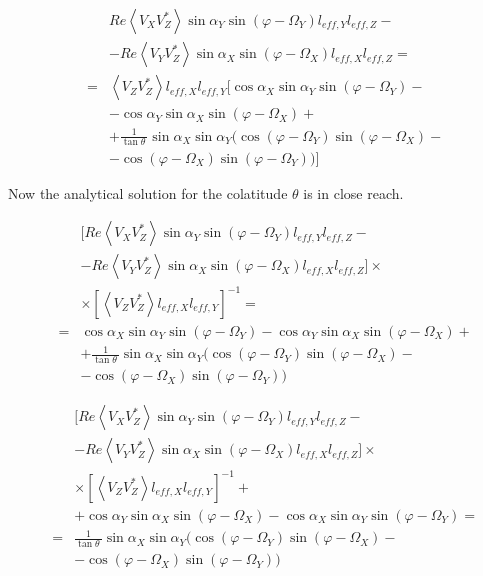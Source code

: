 \documentclass[a4paper,11pt]{report}
\begin{document}
\begin{eqnarray}
&&Re \left\langle V_X V_Z^{*}\right\rangle \sin \alpha_Y  \sin (\varphi - \Omega_Y) l_{eff,Y}l_{eff,Z}-\nonumber \\
&&-Re \left\langle V_Y V_Z^{*}\right\rangle\sin \alpha_X  \sin (\varphi - \Omega_X) l_{eff,X}l_{eff,Z}= \nonumber \\
&=&\left\langle V_Z V_Z^{*} \right\rangle l_{eff,X} l_{eff,Y} [\cos \alpha_X  \sin \alpha_Y  \sin (\varphi - \Omega_Y)- \nonumber \\
&&- \cos \alpha_Y \sin \alpha_X  \sin (\varphi - \Omega_X) + \nonumber \\
&&+  \frac{1}{\tan \theta\ } \sin \alpha_X  \sin \alpha_Y ( \cos (\varphi - \Omega_Y)  \sin (\varphi - \Omega_X)- \nonumber \\
&&-\cos (\varphi - \Omega_X)  \sin (\varphi - \Omega_Y)) ]
\end{eqnarray}

Now the analytical solution for the colatitude $\theta$  is in close reach.

\begin{eqnarray}
&&[Re \left\langle V_X V_Z^{*}\right\rangle \sin \alpha_Y  \sin (\varphi - \Omega_Y) l_{eff,Y}l_{eff,Z}-\nonumber \\
&&-Re \left\langle V_Y V_Z^{*}\right\rangle\sin \alpha_X  \sin (\varphi - \Omega_X) l_{eff,X}l_{eff,Z}]\times \nonumber \\
&& \times \left[ \left\langle V_Z V_Z^{*} \right\rangle l_{eff,X} l_{eff,Y} \right]^{-1} =\nonumber \\
&=& \cos \alpha_X  \sin \alpha_Y  \sin (\varphi - \Omega_Y)-  \cos \alpha_Y \sin \alpha_X  \sin (\varphi - \Omega_X) +\nonumber \\
&&+  \frac{1}{\tan \theta\ } \sin \alpha_X  \sin \alpha_Y ( \cos (\varphi - \Omega_Y)  \sin (\varphi - \Omega_X)-\nonumber \\
&&- \cos (\varphi - \Omega_X)  \sin (\varphi - \Omega_Y))
\end{eqnarray}

\begin{eqnarray}
&&[Re \left\langle V_X V_Z^{*}\right\rangle \sin \alpha_Y  \sin (\varphi - \Omega_Y) l_{eff,Y}l_{eff,Z}-\nonumber \\
&&-Re\left\langle V_Y V_Z^{*}\right\rangle\sin \alpha_X  \sin (\varphi - \Omega_X) l_{eff,X}l_{eff,Z}]\times \nonumber \\
&&\times \left[ \left\langle V_Z V_Z^{*} \right\rangle l_{eff,X} l_{eff,Y}\right]^{-1}+\nonumber \\
&&+\cos \alpha_Y \sin \alpha_X  \sin (\varphi - \Omega_X)-\cos \alpha_X  \sin \alpha_Y  \sin (\varphi - \Omega_Y)=\nonumber \\
&=&  \frac{1}{\tan \theta\ } \sin \alpha_X  \sin \alpha_Y ( \cos (\varphi - \Omega_Y)  \sin (\varphi - \Omega_X) - \nonumber \\
&&-\cos (\varphi - \Omega_X)  \sin (\varphi - \Omega_Y))
\end{eqnarray}
\end{document}
